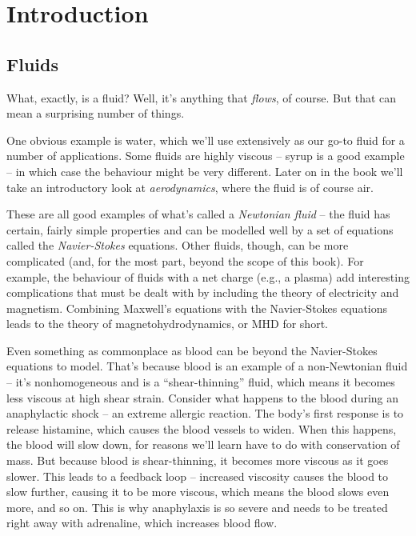 \chapter{Introduction}

\section{Fluids}

What, exactly, is a fluid? Well, it's anything that \emph{flows}, of course. But that can mean a surprising number of things.

One obvious example is water, which we'll use extensively as our go-to fluid for a number of applications. Some fluids are highly viscous -- syrup is a good example -- in which case the behaviour might be very different.  Later on in the book we'll take an introductory look at \emph{aerodynamics}, where the fluid is of course air.  

These are all good examples of what's called a \emph{Newtonian fluid} -- the fluid has certain, fairly simple properties and can be modelled well by a set of equations called the \emph{Navier-Stokes} equations.  Other fluids, though, can be more complicated (and, for the most part, beyond the scope of this book).  For example, the behaviour of fluids with a net charge (e.g., a plasma) add interesting complications that must be dealt with by including the theory of electricity and magnetism.  Combining Maxwell's equations with the Navier-Stokes equations leads to the theory of magnetohydrodynamics, or MHD for short.

Even something as commonplace as blood can be beyond the Navier-Stokes equations to model.  That's because blood is an example of a non-Newtonian fluid -- it's nonhomogeneous and is a ``shear-thinning'' fluid, which means it becomes less viscous at high shear strain.  Consider what happens to the blood during an anaphylactic shock -- an extreme allergic reaction.  The body's first response is to release histamine, which causes the blood vessels to widen.  When this happens, the blood will slow down, for reasons we'll learn have to do with conservation of mass.  But because blood is shear-thinning, it becomes more viscous as it goes slower.  This leads to a feedback loop -- increased viscosity causes the blood to slow further, causing it to be more viscous, which means the blood slows even more, and so on.  This is why anaphylaxis is so severe and needs to be treated right away with adrenaline, which increases blood flow.

